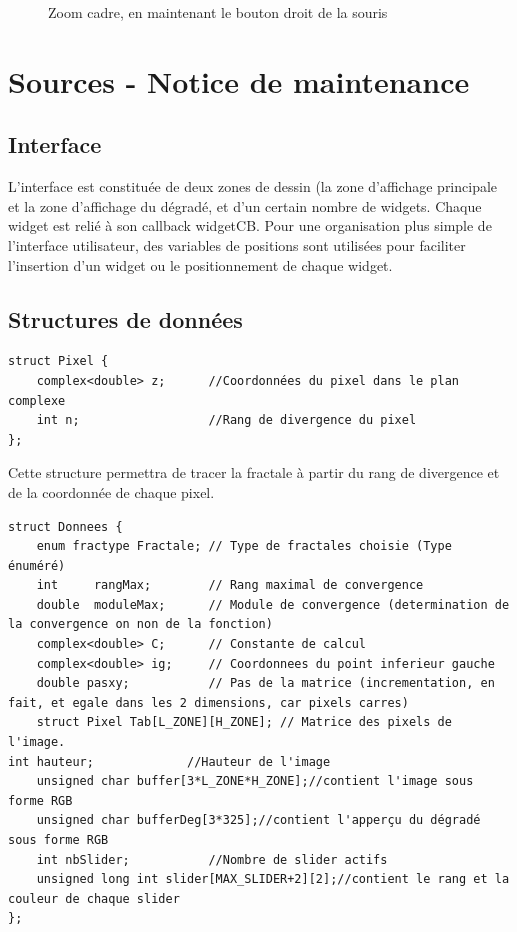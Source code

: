 \documentclass[a4paper,11pt]{article} \usepackage[T1]{fontenc} \usepackage[utf8]{inputenc} \usepackage[francais]{babel}
\begin{document}
\begin{itemize}
\begin{figure}[H]
\begin{center}
            \caption{Zoom cadre, en maintenant le bouton droit de la souris}
        \end{center} \end{figure}

\end{itemize}



\section{Sources - Notice de maintenance}

\subsection{Interface}%
L'interface est constituée de deux zones de dessin (la zone d'affichage principale et la zone d'affichage du dégradé, et d'un certain nombre de widgets. Chaque widget est relié à son callback widgetCB.
Pour une organisation plus simple de l'interface utilisateur, des variables de positions sont utilisées pour faciliter l'insertion d'un widget ou le positionnement  de chaque widget.
\subsection{Structures de données}
\begin{lstlisting}
struct Pixel {
    complex<double> z;      //Coordonnées du pixel dans le plan complexe
    int n;                  //Rang de divergence du pixel
};
\end{lstlisting}

Cette structure permettra de tracer la fractale à partir du rang de divergence et de la coordonnée de chaque pixel.

\begin{lstlisting}
struct Donnees {
    enum fractype Fractale; // Type de fractales choisie (Type énuméré)
    int     rangMax;        // Rang maximal de convergence
    double  moduleMax;      // Module de convergence (determination de la convergence on non de la fonction)
    complex<double> C;      // Constante de calcul
    complex<double> ig;     // Coordonnees du point inferieur gauche
    double pasxy;           // Pas de la matrice (incrementation, en fait, et egale dans les 2 dimensions, car pixels carres)
    struct Pixel Tab[L_ZONE][H_ZONE]; // Matrice des pixels de l'image.
int hauteur;             //Hauteur de l'image
    unsigned char buffer[3*L_ZONE*H_ZONE];//contient l'image sous forme RGB
    unsigned char bufferDeg[3*325];//contient l'apperçu du dégradé sous forme RGB
    int nbSlider;           //Nombre de slider actifs
    unsigned long int slider[MAX_SLIDER+2][2];//contient le rang et la couleur de chaque slider
};

\end{lstlisting}
\end{document}
